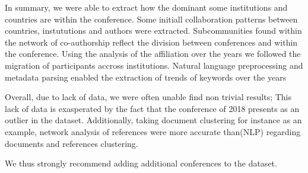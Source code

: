 \documentclass[article,twocolumn]{IEEEtran}
\begin{document}
In summary, we were able to extract how the dominant some institutions
and countries are within the conference. Some initiall collaboration
patterns between countries, instututions and authors were extracted.
Subcommunities found within the network of co-authorship reflect the
division between conferences and within the conference. Using the
analysis of the affiliation over the years we followed the migration of
participants accross institutions. Natural language preprocessing and
metadata parsing enabled the extraction of trends of keywords over the
years

Overall, due to lack of data, we were often unable find non trivial
results; This lack of data is exasperated by the fact that the
conference of 2018 presents as an outlier in the dataset. Additionally,
taking document clustering for instance as an example, network analysis
of references were more accurate than(NLP) regarding documents and
references clustering.

We thus strongly recommend adding additional conferences to the dataset.
\newpage

    
    



    
    
\end{document}
